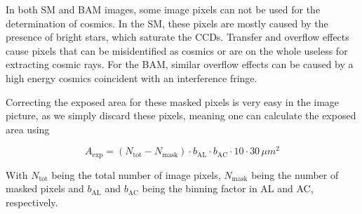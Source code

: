 \documentclass[12pt]{article}
\begin{document}
In both SM and BAM images, some image pixels can not be used for the determination of cosmics. In the SM, these pixels are mostly caused by the presence of bright stars, which saturate the CCDs. Transfer and overflow effects cause pixels that can be misidentified as cosmics or are on the whole useless for extracting cosmic rays. For the BAM, similar overflow effects can be caused by a high energy cosmics coincident with an interference fringe.

Correcting the exposed area for these masked pixels is very easy in the image picture, as we simply discard these pixels, meaning one can calculate the exposed area using

\begin{equation}
  A_\mathrm{exp} = (N_\mathrm{tot} - N_\mathrm{mask}) \cdot b_\mathrm{AL} \cdot b_\mathrm{AC} \cdot 10 \cdot 30 \, \mu m^{2}
\end{equation}

With $N_\mathrm{tot}$ being the total number of image pixels, $N_\mathrm{mask}$ being the number of masked pixels and $b_\mathrm{AL}$ and $b_\mathrm{AC}$ being the binning factor in AL and AC, respectively.
\end{document}

